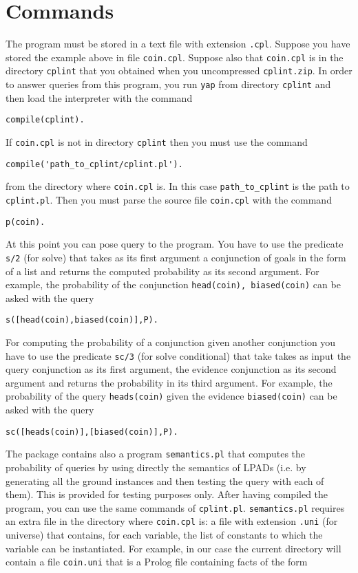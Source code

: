 \documentclass{article}
\begin{document}
\section{Commands}
The program must be stored in a text file with extension \texttt{.cpl}. Suppose you have stored the example above in file \texttt{coin.cpl}. 
Suppose also that \texttt{coin.cpl} is in the directory \texttt{cplint} that you obtained when you uncompressed \texttt{cplint.zip}. In order to answer queries from this program, you run \texttt{yap} from directory \texttt{cplint} and then load the interpreter with the command
\begin{verbatim}
compile(cplint).
\end{verbatim}
If \texttt{coin.cpl} is not in directory \texttt{cplint} then you must use the command
\begin{verbatim}
compile('path_to_cplint/cplint.pl').
\end{verbatim}
from the directory where \texttt{coin.cpl} is.
In this case \verb|path_to_cplint| is the path to \texttt{cplint.pl}.
Then you must parse the source file \texttt{coin.cpl}  with the command
\begin{verbatim}
p(coin).
\end{verbatim}
At this point you can pose query to the program. You have to use the predicate \texttt{s/2} (for solve) that takes as its first argument a conjunction of goals in the form of a list and returns the computed probability as its second argument. For example, the probability of the conjunction \texttt{head(coin), biased(coin)} can be asked with the query
\begin{verbatim}
s([head(coin),biased(coin)],P).
\end{verbatim}
For computing the probability of a conjunction given another conjunction you have to use the predicate \texttt{sc/3} (for solve conditional) that take takes as input the query conjunction as its first argument, the evidence conjunction as its second argument and returns the probability in its third argument.
For example, the probability of  the query \texttt{heads(coin)} given the evidence \texttt{biased(coin)} can be asked with the query
\begin{verbatim}
sc([heads(coin)],[biased(coin)],P).
\end{verbatim}
The package contains also a program \texttt{semantics.pl} that computes the probability of queries by using directly the semantics of LPADs (i.e. by generating all the ground instances and then testing the query with each of them). This is provided for testing purposes only.  After having compiled the program, you can use the same commands of \texttt{cplint.pl}. \texttt{semantics.pl} requires an extra file in the directory where \texttt{coin.cpl} is: a file with extension \texttt{.uni} (for universe) that contains, for each variable, the list of constants to which the variable can be instantiated. For example, in our case the current directory will contain a file \texttt{coin.uni} that is a Prolog file containing facts of the form
\end{document}
